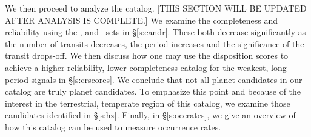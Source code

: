 We then proceed to analyze the catalog. [THIS SECTION WILL BE UPDATED AFTER ANALYSIS IS COMPLETE.] We examine the completeness and reliability using the \injtce, \invtce and \scrtce\ sets in \S\ref{s:candr}. These both decrease significantly as the number of transits decreases, the period increases and the significance of the transit drops-off.  We then discuss how one may use the disposition scores to achieve a higher reliability, lower completeness catalog for the weakest, long-period signals in \S\ref{s:crscores}.  We conclude that not all planet candidates in our catalog are truly planet candidates. To emphasize this point and because of the interest in the terrestrial, temperate region of this catalog, we examine those candidates identified in \S\ref{s:hz}. Finally, in \S\ref{s:occrates}, we give an overview of how this catalog can be used to measure occurrence rates.




